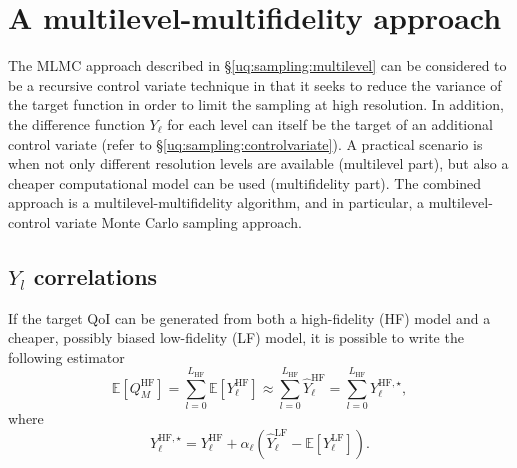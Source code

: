\section{A multilevel-multifidelity approach} \label{uq:sampling:mlmf}

The MLMC approach described in \S\ref{uq:sampling:multilevel} can be considered
to be a recursive control variate technique in that it seeks to reduce
the variance of the target function in order to limit the sampling at
high resolution. In addition, the difference function $Y_\ell$ for
each level can itself be the target of an additional control variate
(refer to \S\ref{uq:sampling:controlvariate}). A practical scenario is
when not only different resolution levels are available (multilevel
part), but also a cheaper computational model can be used
(multifidelity part). The combined approach is a
multilevel-multifidelity algorithm, and in particular, a
multilevel-control variate Monte Carlo sampling approach.

\subsection{$Y_l$ correlations} \label{uq:sampling:mlmf:Ycorr}

If the target QoI can be generated from both a high-fidelity (HF) model 
and a cheaper, possibly biased low-fidelity (LF) model, it is possible 
to write the following estimator
\begin{equation}\label{EQ: MLMF estimator}
 \mathbb{E}\left[Q_M^{\mathrm{HF}}\right] = \sum_{l=0}^{L_{\mathrm{HF}}} \mathbb{E}\left[Y^{\mathrm{HF}}_{\ell}\right] 
                                          \approx \sum_{l=0}^{L_{\mathrm{HF}}} \hat{Y}^{\mathrm{HF}}_{\ell} = \sum_{l=0}^{L_{\mathrm{HF}}} Y^{{\mathrm{HF}},\star}_{\ell},
\end{equation}
where
\begin{equation}
 Y^{{\mathrm{HF}},\star}_{\ell} = Y^{\mathrm{HF}}_{\ell} + \alpha_\ell \left( \hat{Y}^{\mathrm{LF}}_{\ell} - \mathbb{E}\left[{Y^{\mathrm{LF}}_{\ell}}\right] \right).
\end{equation}

